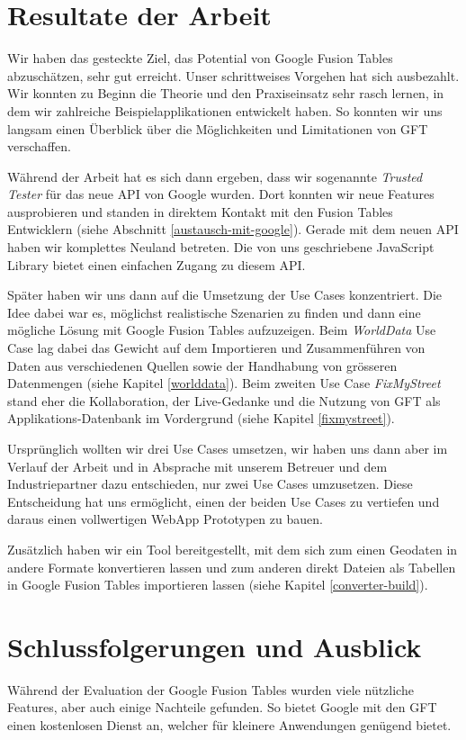 \section{Resultate der Arbeit}
Wir haben das gesteckte Ziel, das Potential von Google Fusion Tables abzuschätzen, sehr gut erreicht. Unser schrittweises Vorgehen hat sich ausbezahlt. Wir konnten zu Beginn die Theorie und den Praxiseinsatz sehr rasch lernen, in dem wir zahlreiche Beispielapplikationen entwickelt haben. So konnten wir uns langsam einen Überblick über die Möglichkeiten und Limitationen von GFT verschaffen.

Während der Arbeit hat es sich dann ergeben, dass wir sogenannte \emph{Trusted Tester} für das neue \gls{API} von Google wurden. Dort konnten wir neue Features ausprobieren und standen in direktem Kontakt mit den Fusion Tables Entwicklern (siehe Abschnitt \ref{austausch-mit-google}). Gerade mit dem neuen \gls{API} haben wir komplettes Neuland betreten. Die von uns geschriebene JavaScript Library bietet einen einfachen Zugang zu diesem \gls{API}.

Später haben wir uns dann auf die Umsetzung der Use Cases konzentriert. Die Idee dabei war es, möglichst realistische Szenarien zu finden und dann eine mögliche Lösung mit Google Fusion Tables aufzuzeigen. Beim \emph{WorldData} Use Case lag dabei das Gewicht auf dem Importieren und Zusammenführen von Daten aus verschiedenen Quellen sowie der Handhabung von grösseren Datenmengen (siehe Kapitel \ref{worlddata}). Beim zweiten Use Case \emph{FixMyStreet} stand eher die Kollaboration, der Live-Gedanke und die Nutzung von GFT als Applikations-Datenbank im Vordergrund (siehe Kapitel \ref{fixmystreet}).

Ursprünglich wollten wir drei Use Cases umsetzen, wir haben uns dann aber im Verlauf der Arbeit und in Absprache mit unserem Betreuer und dem Industriepartner dazu entschieden, nur zwei Use Cases umzusetzen. Diese Entscheidung hat uns ermöglicht, einen der beiden Use Cases zu vertiefen und daraus einen vollwertigen \gls{WebApp} Prototypen zu bauen.

Zusätzlich haben wir ein Tool bereitgestellt, mit dem sich zum einen Geodaten in andere Formate konvertieren lassen und zum anderen direkt Dateien als Tabellen in Google Fusion Tables importieren lassen (siehe Kapitel \ref{converter-build}).

\section{Schlussfolgerungen und Ausblick}
Während der Evaluation der Google Fusion Tables wurden viele nützliche Features, aber auch einige Nachteile gefunden. So bietet Google mit den GFT einen kostenlosen Dienst an, welcher für kleinere Anwendungen genügend bietet.

